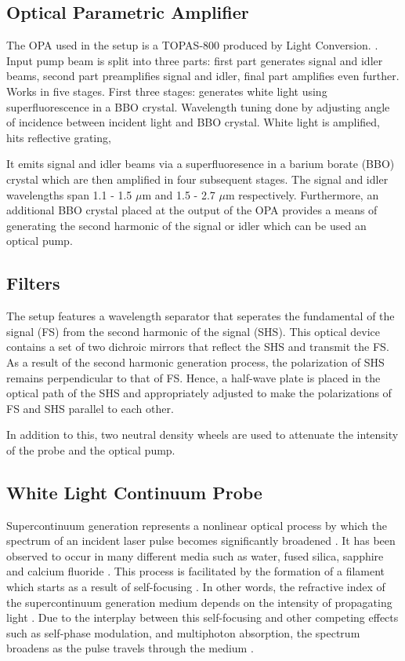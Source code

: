 \subsection{Optical Parametric Amplifier}

The OPA used in the setup is a TOPAS-800 produced by Light Conversion. \cite{topas}. Input pump beam is split into three parts: first part generates signal and idler beams, second part preamplifies signal and idler, final part amplifies even further. Works in five stages. First three stages: generates white light using superfluorescence in a BBO crystal. Wavelength tuning done by adjusting angle of incidence between incident light and BBO crystal. White light is amplified, hits reflective grating, 

It emits signal and idler beams via a superfluoresence in a barium borate (BBO) crystal which are then amplified in four subsequent stages. The signal and idler wavelengths span 1.1 - 1.5 $\mu$m  and 1.5 - 2.7 $\mu$m respectively. Furthermore, an additional BBO crystal placed at the output of the OPA provides a means of generating the second harmonic of the signal or idler which can be used an optical pump.

\subsection{Filters}

The setup features a wavelength separator that seperates the fundamental of the signal (FS) from the second harmonic of the signal (SHS). This optical device contains a set of two dichroic mirrors that reflect the SHS and transmit the FS. As a result of the second harmonic generation process, the polarization of SHS remains perpendicular to that of FS. Hence, a half-wave plate is placed in the optical path of the SHS and appropriately adjusted to make the polarizations of FS and SHS parallel to each other. 

In addition to this, two neutral density wheels are used to attenuate the intensity of the probe and the optical pump.

\subsection{White Light Continuum Probe}


\label{section:white_light_probe}
Supercontinuum generation represents a nonlinear optical process by which the spectrum of an incident laser pulse becomes significantly broadened \cite{dubietis2017ultrafast}. It has been observed to occur in many different media such as water, fused silica, sapphire and calcium fluoride \cite{dubietis2017ultrafast}. This process is facilitated by the formation of a filament which starts as a result of self-focusing \cite{dubietis2017ultrafast}. In other words, the refractive index of the supercontinuum generation medium depends on the intensity of propagating light \cite{dubietis2017ultrafast}. Due to the interplay between this self-focusing and other competing effects such as self-phase modulation, and multiphoton absorption, the spectrum  broadens as the pulse travels through the medium \cite{dubietis2017ultrafast}. 

